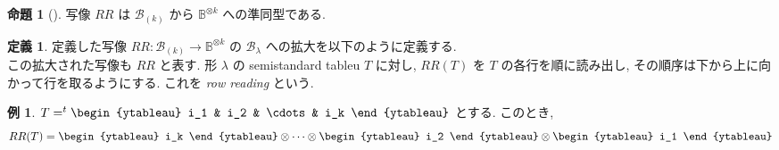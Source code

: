\documentclass[
  a4paper, 
  12pt,
  ja=standard,
  xelatex,
  left=30truemm,
  right=30truemm,
  titlepage 
]{bxjsarticle}
\theoremstyle{definition}
\newtheorem{df}{定義}
\newtheorem{prop}[thm]{命題}
\newtheorem*{ex}{例}
\begin{document}
\begin{prop} [{\cite[命題3.1]{b1}}] 
  写像 $RR$ は $\mathscr{B}_{(k)}$ から $\mathbb{B}^{ \otimes k}$ への準同型である.
\end{prop}

\begin{df}
  定義した写像 $RR : \mathscr{B}_{(k)} \to \mathbb{B}^{ \otimes k}$ の $\mathscr{B}_\lambda$
  への拡大を以下のように定義する. \\
  この拡大された写像も $RR$ と表す. 形 $\lambda$ の semistandard tableu $T$ に対し, 
  $RR(T)$ を $T$ の各行を順に読み出し, その順序は下から上に向かって行を取るようにする.
  これを \textit{row reading} という.
\end{df} 
 
\begin{ex}
  $ T = ^{t} \vcenter{\hbox{\begin{ytableau} i_1 & i_2 & \cdots & i_k \end{ytableau}} }$ とする. このとき,
$$ 
RR(T) = \vcenter{\hbox{\begin{ytableau}  i_k \end{ytableau}}} \otimes 
        \cdots \otimes
        \vcenter{\hbox{\begin{ytableau}  i_2 \end{ytableau}}} \otimes
        \vcenter{\hbox{\begin{ytableau}  i_1 \end{ytableau}}} 
$$
\end{ex}
\end{document}
